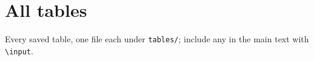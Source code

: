 \documentclass[11pt]{article}
\begin{document}
\section{All tables}
Every saved table, one file each under \texttt{tables/}; include any in the main text with \texttt{\textbackslash input}.

\clearpage

\clearpage

\clearpage

\clearpage

\clearpage

\clearpage

\clearpage

\clearpage

\clearpage

\clearpage

\clearpage

\clearpage

\clearpage

\clearpage

\clearpage

\clearpage

\clearpage

\clearpage

\clearpage

\clearpage
\end{document}
